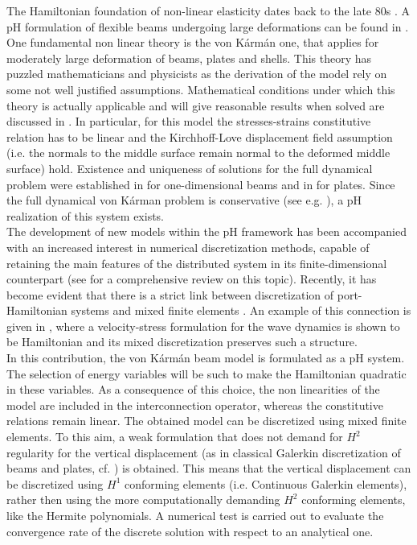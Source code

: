 \documentclass{ifacconf}
\begin{document}
The Hamiltonian foundation of non-linear elasticity dates back to the late 80s \citep{simo1988}. A pH formulation of flexible beams undergoing large deformations can be found in \cite{macchelli2007fl,macchelli2009flrig}. One fundamental non linear theory is the von K\'arm\'an one, that applies for moderately large deformation of beams, plates and shells. This theory has puzzled mathematicians and physicists as the derivation of the model rely on some not well justified assumptions. Mathematical conditions under which this theory is actually applicable and will give reasonable results when solved are discussed in \cite{ciarlet1980,ciarlet1990}. In particular, for this model the stresses-strains constitutive relation has to be linear and the Kirchhoff-Love displacement field assumption (i.e. the normals to the middle surface remain normal to the deformed middle surface) hold. Existence and uniqueness of solutions for the full dynamical problem were established in \cite{lagnese1991uniform} for one-dimensional beams and in \cite{puel1996} for plates. Since the full dynamical von K\'arman problem is conservative (see e.g. \cite{bilbao2015conservative}), a pH realization of this system exists. \\

The development of new models within the pH framework has been accompanied with an increased interest in numerical discretization methods, capable of retaining the main features of the distributed system in its finite-dimensional counterpart (see \cite{rashad2020review} for a comprehensive review on this topic). Recently, it has become evident that there is a strict link between  discretization of port-Hamiltonian  systems and mixed finite elements \citep{cardoso2020pfem}. An example of this connection is given in \cite{kirby2015}, where a velocity-stress formulation for the wave dynamics is shown to be Hamiltonian and its mixed discretization preserves such a structure. \\

In this contribution, the von K\'arm\'an beam model is formulated as a pH system. The selection of energy variables will be such to make the Hamiltonian quadratic in these variables. As a consequence of this choice, the non linearities of the model are included in the interconnection operator, whereas the constitutive relations remain linear. The obtained model can be discretized using mixed finite elements. To this aim, a weak formulation that does not demand for $H^2$ regularity for the vertical displacement (as in classical Galerkin discretization of beams and plates, cf. \cite{gustafsson2018}) is obtained. This means that the vertical displacement can be discretized using $H^1$ conforming elements (i.e. Continuous Galerkin elements), rather then using the more computationally demanding $H^2$ conforming elements, like the Hermite polynomials. A numerical test is carried out to evaluate the convergence rate of the discrete solution with respect to an analytical one. \\
\end{document}
